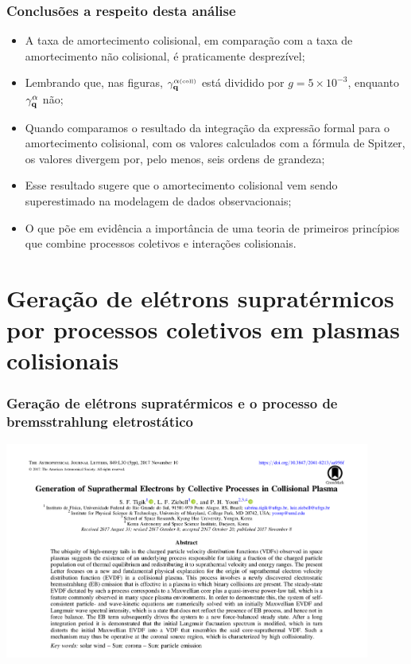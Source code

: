 \documentclass[10pt,aspectratio=1610,lualatex]{beamer}
\begin{document}
\begin{frame}
  \frametitle{Conclusões a respeito desta análise}
  \begin{itemize}
    \item A taxa de amortecimento colisional, em comparação com
    a taxa de amortecimento não colisional, é praticamente desprezível;
    \vspace{0.4cm}
    \pause
    \item Lembrando que, nas figuras, $\gamma_{\bf q}^{\alpha \mbox{\tiny(coll)}}$
    está dividido por  $g=5\times 10^{-3}$, enquanto $\gamma_{\bf q}^\alpha$ não;
    \vspace{0.4cm}
    \pause
    \item Quando comparamos o resultado da integração da expressão formal
    para o amortecimento colisional, com os valores calculados com a
    fórmula de Spitzer, os valores divergem por, pelo menos, seis ordens
    de grandeza;
    \vspace{0.4cm}
    \pause
    \item Esse resultado sugere que o amortecimento colisional
    vem sendo superestimado na modelagem de dados observacionais;
    \vspace{0.4cm}
    \pause
    \item O que põe em evidência a importância de uma teoria de primeiros
    princípios que combine processos coletivos e interações colisionais.
  \end{itemize}
\end{frame}

\section*{Geração de elétrons supratérmicos por processos
  coletivos em plasmas colisionais}
\begin{frame}
  \frametitle{Geração de elétrons supratérmicos e o processo de
    bremsstrahlung eletrostático}
 \centering \includegraphics[width=0.9\textwidth]{print_Tigik2017a.png}
\end{frame}
\end{document}
